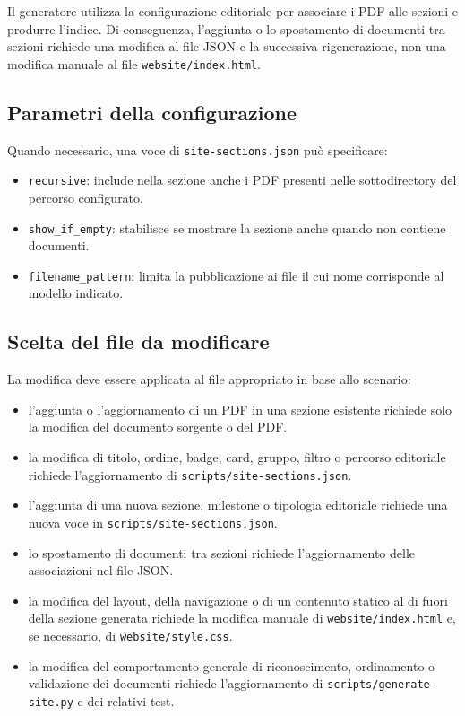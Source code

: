 \documentclass[11pt, a4paper]{article}
\begin{document}
Il generatore utilizza la configurazione editoriale per associare i PDF alle sezioni e produrre l'indice. Di conseguenza, l'aggiunta o lo spostamento di documenti tra sezioni richiede una modifica al file JSON e la successiva rigenerazione, non una modifica manuale al file \texttt{website/index.html}.

\subsection{Parametri della configurazione}

Quando necessario, una voce di \texttt{site-sections.json} può specificare:
\begin{itemize}
    \item \texttt{recursive}: include nella sezione anche i PDF presenti nelle sottodirectory del percorso configurato.
    \item \texttt{show\_if\_empty}: stabilisce se mostrare la sezione anche quando non contiene documenti.
    \item \texttt{filename\_pattern}: limita la pubblicazione ai file il cui nome corrisponde al modello indicato.
\end{itemize}

\subsection{Scelta del file da modificare}

La modifica deve essere applicata al file appropriato in base allo scenario:
\begin{itemize}
    \item l'aggiunta o l'aggiornamento di un PDF in una sezione esistente richiede solo la modifica del documento sorgente o del PDF.
    \item la modifica di titolo, ordine, badge, card, gruppo, filtro o percorso editoriale richiede l'aggiornamento di \texttt{scripts/site-sections.json}.
    \item l'aggiunta di una nuova sezione, milestone o tipologia editoriale richiede una nuova voce in \texttt{scripts/site-sections.json}.
    \item lo spostamento di documenti tra sezioni richiede l'aggiornamento delle associazioni nel file JSON.
    \item la modifica del layout, della navigazione o di un contenuto statico al di fuori della sezione generata richiede la modifica manuale di \texttt{website/index.html} e, se necessario, di \texttt{website/style.css}.
    \item la modifica del comportamento generale di riconoscimento, ordinamento o validazione dei documenti richiede l'aggiornamento di \texttt{scripts/generate-site.py} e dei relativi test.
\end{itemize}
\end{document}
